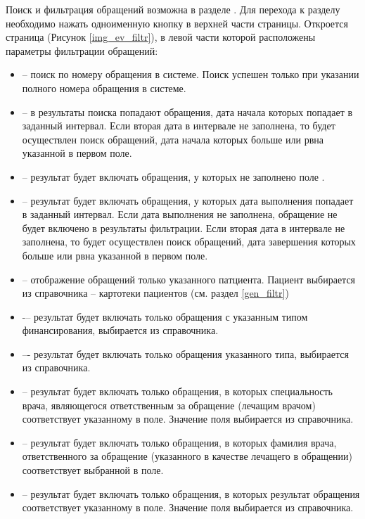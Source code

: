 Поиск и фильтрация обращений возможна в разделе . Для перехода к разделу необходимо нажать одноименную кнопку в верхней части страницы. Откроется страница (Рисунок \ref{img_ev_filtr}), в левой части которой расположены параметры фильтрации обращений: 

\begin{itemize}
 \item {} -- поиск по номеру обращения в системе. Поиск успешен только при указании полного номера обращения в системе.
 \item {} -- в результаты поиска попадают обращения, дата начала которых попадает в заданный интервал. Если вторая дата в интервале не заполнена, то будет осуществлен поиск обращений, дата начала которых больше или рвна указанной в первом поле.
 \item {} -- результат будет включать обращения, у которых не заполнено поле .
 \item {} -- результат будет включать обращения, у которых дата выполнения попадает в заданный интервал. Если дата выполнения не заполнена, обращение не будет включено в результаты фильтрации. Если вторая дата в интервале не заполнена, то будет осуществлен поиск обращений, дата завершения которых больше или рвна указанной в первом поле.
 \item {} -- отображение обращений только указанного патциента. Пациент выбирается из справочника -- картотеки пациентов (см. раздел \ref{gen_filtr})
 \item {} -– результат будет включать только обращения с указанным типом финансирования, выбирается из справочника.
 \item {} –- результат будет включать только обращения указанного типа, выбирается из справочника.
 \item {} -- результат будет включать только обращения, в которых специальность врача, являющегося ответственным за обращение (лечащим врачом) соответствует указанному в поле. Значение поля выбирается из справочника.
 \item {} -- результат будет включать только обращения, в которых фамилия врача, ответственного за обращение (указанного в качестве лечащего в обращении) соответствует выбранной в поле.
 \item {} -- результат будет включать только обращения, в которых результат обращения соответствует указанному в поле. Значение поля выбирается из справочника.
\end{itemize}

